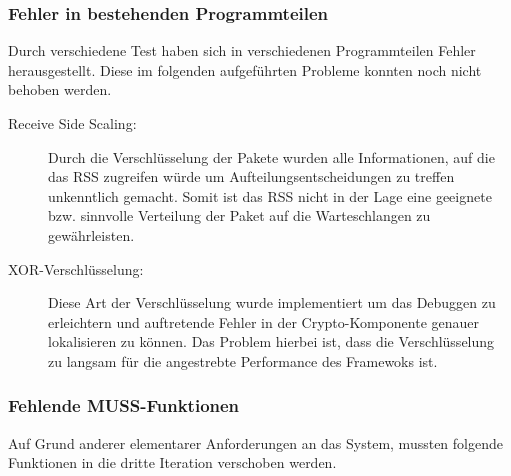 \documentclass[a4paper, 11pt, ngerman, fleqn]{article}
\begin{document}
\subsubsection{Fehler in bestehenden Programmteilen}
Durch verschiedene Test haben sich in verschiedenen Programmteilen Fehler herausgestellt. 
Diese im folgenden aufgeführten Probleme konnten noch nicht behoben werden.

\begin{description}

\item[Receive Side Scaling:] Durch die Verschlüsselung der Pakete wurden alle Informationen, auf die das RSS zugreifen würde um Aufteilungsentscheidungen zu treffen unkenntlich gemacht. Somit ist das RSS nicht in der Lage eine geeignete bzw. sinnvolle Verteilung der Paket auf die Warteschlangen zu gewährleisten.

\item[XOR-Verschlüsselung:] Diese Art der Verschlüsselung wurde implementiert um das Debuggen zu erleichtern und auftretende Fehler in der Crypto-Komponente genauer lokalisieren zu können. Das Problem hierbei ist, dass die Verschlüsselung zu langsam für die angestrebte Performance des Framewoks ist.

\end{description}

\subsubsection{Fehlende MUSS-Funktionen}
Auf Grund anderer elementarer Anforderungen an das System, mussten folgende Funktionen in die dritte Iteration verschoben werden.
\end{document}
